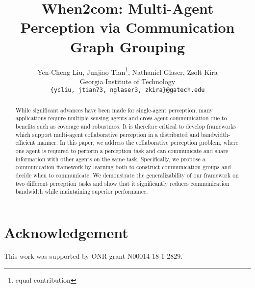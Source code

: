 \documentclass[10pt,twocolumn,letterpaper]{article}
\begin{document}
\title{When2com: Multi-Agent Perception via Communication Graph Grouping}
\author{Yen-Cheng Liu, Junjiao Tian\thanks{equal contribution}, Nathaniel Glaser\footnotemark[1],  Zsolt Kira\\
Georgia Institute of Technology\\
{\tt\small \{ycliu, jtian73, nglaser3, zkira\}@gatech.edu}
}

\maketitle

\begin{abstract}

While significant advances have been made for single-agent perception, many applications require multiple sensing agents and cross-agent communication due to benefits such as coverage and robustness. 
It is therefore critical to develop frameworks which support multi-agent collaborative perception in a distributed and bandwidth-efficient manner. 
In this paper, we address the collaborative perception problem, where one agent is required to perform a perception task and can communicate and share information with other agents on the same task. 
Specifically, we propose a communication framework by learning both to construct communication groups and decide when to communicate. 
We demonstrate the generalizability of our framework on two different perception tasks and show that it significantly reduces communication bandwidth while maintaining superior performance. 

\end{abstract}







\section{Acknowledgement}
\label{sec:acknowledgement}
This work was supported by ONR grant N00014-18-1-2829.

{\small


}
\end{document}
